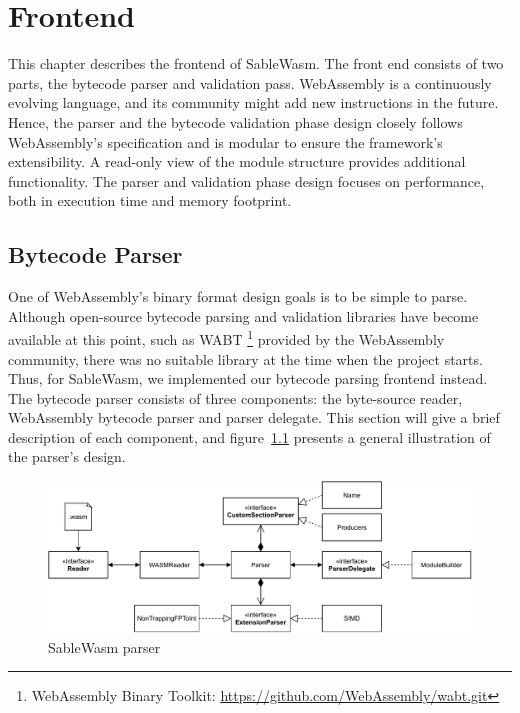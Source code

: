 \chapter{Frontend}

This chapter describes the frontend of SableWasm. The front end consists of two
parts, the bytecode parser and validation pass. WebAssembly is a continuously
evolving language, and its community might add new instructions in the future.
Hence, the parser and the bytecode validation phase design closely follows
WebAssembly's specification and is modular to ensure the framework's
extensibility. A read-only view of the module structure provides additional
functionality. The parser and validation phase design focuses on performance,
both in execution time and memory footprint.

\section{Bytecode Parser}
One of WebAssembly's binary format design goals is to be simple to parse.
Although open-source bytecode parsing and validation libraries have become
available at this point, such as WABT \footnote{WebAssembly Binary Toolkit:
  \url{https://github.com/WebAssembly/wabt.git}} provided by the WebAssembly
community, there was no suitable library at the time when the project starts.
Thus, for SableWasm, we implemented our bytecode parsing frontend instead. The
bytecode parser consists of three components: the byte-source reader,
WebAssembly bytecode parser and parser delegate. This section will give a brief
description of each component, and figure~\ref{fig:sablewasm-parser} presents a
general illustration of the parser's design.

\begin{figure}
  \centering
  \includegraphics[width=\textwidth]{Images/sablewasm-parser.pdf}
  \caption{SableWasm parser}
  \label{fig:sablewasm-parser}
\end{figure}

